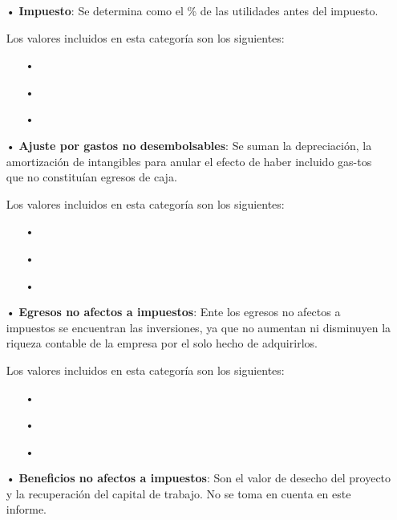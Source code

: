 \begin{enumerate}
\item[•]\textbf{Impuesto}:
Se determina como el \% de las utilidades antes del impuesto.

Los valores incluidos en esta categoría son los siguientes:
\begin{enumerate}
\item[•]
\item[•]
\item[•]
\end{enumerate}



\item[•]\textbf{Ajuste por gastos no desembolsables}:
Se suman la depreciación, la amortización 
de intangibles para anular el efecto de haber incluido gas-tos que no constituían egresos de caja.

Los valores incluidos en esta categoría son los siguientes:
\begin{enumerate}
\item[•]
\item[•]
\item[•]
\end{enumerate}


\item[•]\textbf{Egresos no afectos a impuestos}:
Ente los egresos no afectos a impuestos se encuentran las inversiones, ya que no aumentan ni disminuyen la riqueza contable de la empresa por el solo hecho de adquirirlos.

Los valores incluidos en esta categoría son los siguientes:
\begin{enumerate}
\item[•]
\item[•]
\item[•]
\end{enumerate}


\item[•]\textbf{Beneficios no afectos a impuestos}:
Son el valor de desecho del proyecto y la recuperación del capital de trabajo. No se toma en cuenta en este informe.



\end{enumerate}